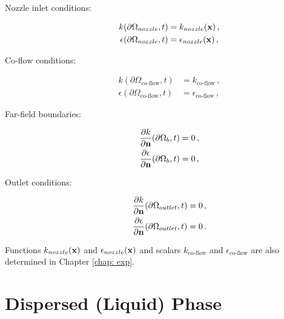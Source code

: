 \begin{description}
 \item[Nozzle inlet conditions:]
\begin{subequations}
 \begin{align}
  k(\partial \Omega_{nozzle},t) &= k_{nozzle}(\mathbf{x}) \, ,\\
  \epsilon(\partial \Omega_{nozzle},t) &= \epsilon_{nozzle}(\mathbf{x}) \, ,
 \end{align}
\end{subequations}

\item[Co-flow conditions:]
\begin{subequations}
 \begin{align}
  k(\partial \Omega_{\text{co-flow}},t) &= k_{\text{co-flow}} \, , \\
  \epsilon(\partial \Omega_{\text{co-flow}},t) &= \epsilon_{\text{co-flow}} \, ,
 \end{align}
\end{subequations}

\item[Far-field boundaries:]
\begin{subequations}
 \begin{align}
  \frac{\partial k}{\partial \mathbf{n}} (\partial \Omega_b,t) &= 0 \, , \\
  \frac{\partial \epsilon}{\partial \mathbf{n}} (\partial \Omega_b,t) &= 0 \, ,
 \end{align}
\end{subequations}

\item[Outlet conditions:]
\begin{subequations}
 \begin{align}
  \frac{\partial k}{\partial \mathbf{n}} (\partial \Omega_{outlet},t) &= 0 \, , \\
  \frac{\partial \epsilon}{\partial \mathbf{n}} (\partial \Omega_{outlet},t) &= 0 \, .
 \end{align}
\end{subequations}
\end{description}

Functions $k_{nozzle}(\mathbf{x})$ and $\epsilon_{nozzle}(\mathbf{x})$ and scalars $k_{\text{co-flow}}$ and $\epsilon_{\text{co-flow}}$ are also determined in Chapter \ref{chap: exp}.

\section{Dispersed (Liquid) Phase}


